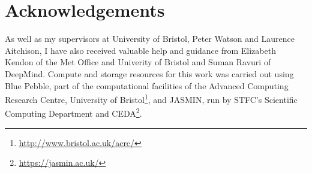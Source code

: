 \section{Acknowledgements}

As well as my supervisors at University of Bristol, Peter Watson and Laurence Aitchison, I have also received valuable help and guidance from Elizabeth Kendon of the Met Office and Univerity of Bristol and Suman Ravuri of DeepMind. Compute and storage resources for this work was carried out using Blue Pebble, part of the computational facilities of the Advanced Computing Research Centre, University of Bristol\footnote{\url{http://www.bristol.ac.uk/acrc/}}, and JASMIN, run by STFC's Scientific Computing Department and CEDA\footnote{\url{https://jasmin.ac.uk/}}.
